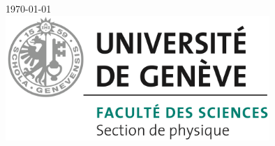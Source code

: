 \documentclass[12pt]{article}
\begin{document}
\begin{titlepage}


{\large \today}\\[2cm] %


\includegraphics[width=10cm]{Images/logos/physique_logo.png}\\[1cm] %
 

\vfill %

\end{titlepage}





\tableofcontents
\newpage
\end{document}
